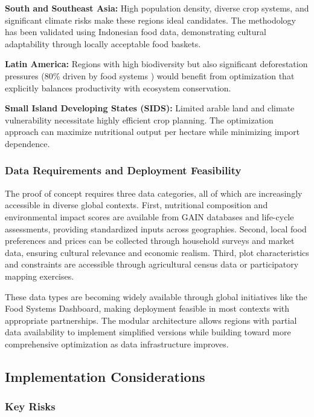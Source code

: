 \documentclass{oqireport}
\begin{document}
\textbf{South and Southeast Asia:} High population density, diverse crop systems, and significant climate risks make these regions ideal candidates. The methodology has been validated using Indonesian food data, demonstrating cultural adaptability through locally acceptable food baskets.

\textbf{Latin America:} Regions with high biodiversity but also significant deforestation pressures (80\% driven by food systems \cite{Fanzo2022}) would benefit from optimization that explicitly balances productivity with ecosystem conservation.

\textbf{Small Island Developing States (SIDS):} Limited arable land and climate vulnerability necessitate highly efficient crop planning. The optimization approach can maximize nutritional output per hectare while minimizing import dependence.

\subsubsection{Data Requirements and Deployment Feasibility}

The proof of concept requires three data categories, all of which are increasingly accessible in diverse global contexts. First, nutritional composition and environmental impact scores are available from GAIN databases and life-cycle assessments, providing standardized inputs across geographies. Second, local food preferences and prices can be collected through household surveys and market data, ensuring cultural relevance and economic realism. Third, plot characteristics and constraints are accessible through agricultural census data or participatory mapping exercises.

These data types are becoming widely available through global initiatives like the Food Systems Dashboard, making deployment feasible in most contexts with appropriate partnerships. The modular architecture allows regions with partial data availability to implement simplified versions while building toward more comprehensive optimization as data infrastructure improves.

\subsection{Implementation Considerations}

\subsubsection{Key Risks}
\end{document}
